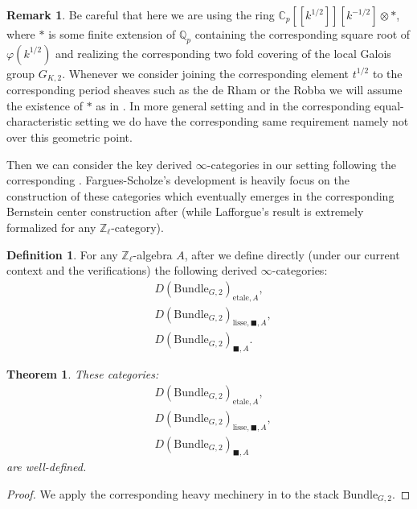 \documentclass[12pt]{book}
\newtheorem{theorem}{Theorem}
\theoremstyle{definition}
\newtheorem{definition}{Definition}
\newtheorem{remark}{Remark}
\begin{document}
\begin{remark}
Be careful that here we are using the ring $\mathbb{C}_p[[k^{1/2}]][k^{-1/2}]\otimes *$, where $*$ is some finite extension of $\mathbb{Q}_p$ containing the corresponding square root of $\varphi(k^{1/2})$ and realizing the corresponding two fold covering of the local Galois group $G_{K,2}$. Whenever we consider joining the corresponding element $t^{1/2}$ to the corresponding period sheaves such as the de Rham or the Robba we will assume the existence of $*$ as in \cite{BS}. In more general setting and in the corresponding equal-characteristic setting we do have the corresponding same requirement namely not over this geometric point.

\end{remark}





\noindent Then we can consider the key derived $\infty$-categories in our setting following the corresponding \cite{FS}. Fargues-Scholze's development is heavily focus on the construction of these categories which eventually emerges in the corresponding Bernstein center construction after \cite{VLa} (while Lafforgue's result is extremely formalized for any $\mathbb{Z}_\ell$-category).


\begin{definition}
For any $\mathbb{Z}_\ell$-algebra $A$, after \cite{FS} we define directly (under our current context and the verifications) the following derived $\infty$-categories:
\begin{align}
&D(\mathrm{Bundle}_{G,2})_{\text{etale},A},\\
&D(\mathrm{Bundle}_{G,2})_{\text{lisse},\blacksquare,A},\\
&D(\mathrm{Bundle}_{G,2})_{\blacksquare,A}.
\end{align}
\end{definition}

\begin{theorem}
These categories:
\begin{align}
&D(\mathrm{Bundle}_{G,2})_{\text{etale},A},\\
&D(\mathrm{Bundle}_{G,2})_{\text{lisse},\blacksquare,A},\\
&D(\mathrm{Bundle}_{G,2})_{\blacksquare,A}
\end{align}
are well-defined.
\end{theorem}

\begin{proof}
We apply the corresponding heavy mechinery in \cite[Chapter V, Chapter VII]{FS} to the stack $\mathrm{Bundle}_{G,2}$.
\end{proof}
\end{document}
